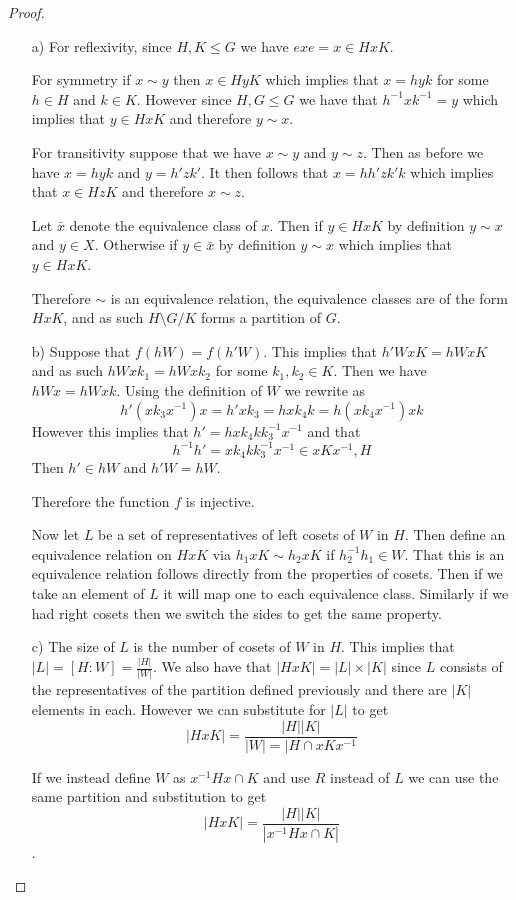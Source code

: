 \documentclass[10pt]{article}
\theoremstyle{plain}
\theoremstyle{remark}
\begin{document}
\begin{proof}
  \begin{itemize}
  \item[a)] For reflexivity, since $H,K\leq G$ we have $exe=x\in HxK$.

    For symmetry if $x\sim y$ then $x\in HyK$ which implies that $x=hyk$ for some $h\in H$ and
    $k\in K$. However since $H,G\leq G$ we have that $h^{-1}xk^{-1}=y$ which implies that
    $y\in HxK$ and therefore $y\sim x$.

    For transitivity suppose that we have $x\sim y$ and $y\sim z$. Then as before we have
    $x=hyk$ and $y=h'zk'$. It then follows that $x=hh'zk'k$ which implies that $x\in HzK$
    and therefore $x\sim z$.

    Let $\bar{x}$ denote the equivalence class of $x$. Then if $y\in HxK$ by definition
    $y\sim x$ and $y\in X$. Otherwise if $y\in \bar{x}$ by definition $y\sim x$ which implies that
    $y\in HxK$.

    Therefore $\sim$ is an equivalence relation, the equivalence classes are
    of the form $HxK$, and as such $H\setminus G/ K$ forms a partition of $G$.
  \item[b)] Suppose that $f(hW)=f(h'W)$. This implies that
    $h'WxK = hWxK$ and as such $hWxk_1=hWxk_2$ for some $k_1,k_2\in K$.
    Then we have $hWx=hWxk$. Using the definition of $W$ we rewrite
    as
    \[ h'(xk_3x^{-1})x = h'xk_3 = hxk_4k = h(xk_4x^{-1})xk\]
    However this implies that $h' = hxk_4kk_3^{-1}x^{-1}$ and that
    \[ h^{-1}h' = xk_4kk_3^{-1}x^{-1}\in xKx^{-1},H \]
    Then $h'\in hW$ and $h'W=hW$.

    Therefore the function $f$ is injective.

    Now let $L$ be a set of representatives of left cosets of $W$ in $H$. Then
    define an equivalence relation on $HxK$ via $h_1xK\sim h_2xK$ if $h_2^{-1}h_1\in W$.
    That this is an equivalence relation follows directly from the properties
    of cosets. Then if we take an element of $L$ it will map one to each
    equivalence class. Similarly if we had right cosets then we switch the
    sides to get the same property.
  \item[c)] The size of $L$ is the number of cosets of $W$ in $H$. This
    implies that $|L|=[H:W]=\frac{|H|}{|W|}$. We also have that
    $|HxK|=|L|\times |K|$ since $L$ consists of the representatives of the partition
    defined previously and there are $|K|$ elements in each. However
    we can substitute for $|L|$ to get
    \[ |HxK|=\frac{|H||K|}{|W|=|H\cap xKx^{-1}} \]

    If we instead define $W$ as $x^{-1}Hx\cap K$ and use $R$ instead of $L$
    we can use the same partition and substitution to get
    \[ |HxK|=\frac{|H||K|}{|x^{-1}Hx\cap K|}\].
  \end{itemize}
\end{proof}
\end{document}
